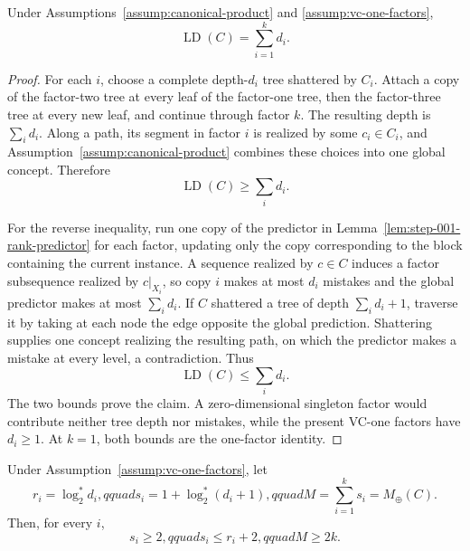 \begin{proposition}
\label{prop:step-001-product-littlestone}
Under Assumptions~\ref{assump:canonical-product} and
\ref{assump:vc-one-factors},
\[
\operatorname{LD}(C)=\sum_{i=1}^k d_i.
\]
\end{proposition}

\begin{proof}
For each \(i\), choose a complete depth-\(d_i\) tree shattered by \(C_i\).
Attach a copy of the factor-two tree at every leaf of the factor-one tree,
then the factor-three tree at every new leaf, and continue through factor
\(k\).  The resulting depth is \(\sum_i d_i\).  Along a path, its segment
in factor \(i\) is realized by some \(c_i\in C_i\), and
Assumption~\ref{assump:canonical-product} combines these choices into one
global concept.  Therefore
\begin{equation}\label{eq:step-001-ld-lower}
\operatorname{LD}(C)\ge\sum_i d_i.
\end{equation}

For the reverse inequality, run one copy of the predictor in
Lemma~\ref{lem:step-001-rank-predictor} for each factor, updating only the
copy corresponding to the block containing the current instance.  A
sequence realized by \(c\in C\) induces a factor subsequence realized by
\(c|_{X_i}\), so copy \(i\) makes at most \(d_i\) mistakes and the global
predictor makes at most \(\sum_i d_i\).  If \(C\) shattered a tree of depth
\(\sum_i d_i+1\), traverse it by taking at each node the edge opposite the
global prediction.  Shattering supplies one concept realizing the resulting
path, on which the predictor makes a mistake at every level, a contradiction.
Thus
\begin{equation}\label{eq:step-001-ld-upper}
\operatorname{LD}(C)\le\sum_i d_i.
\end{equation}
The two bounds prove the claim.  A zero-dimensional singleton factor would
contribute neither tree depth nor mistakes, while the present VC-one factors
have \(d_i\ge1\).  At \(k=1\), both bounds are the one-factor identity.
\end{proof}

\begin{lemma}
\label{lem:step-001-logstar}
Under Assumption~\ref{assump:vc-one-factors}, let
\[
r_i=\log_2^*d_i,qquad
s_i=1+\log_2^*(d_i+1),qquad
M=\sum_{i=1}^k s_i=M_{\oplus}(C).
\]
Then, for every \(i\),
\[
s_i\ge2,qquad s_i\le r_i+2,qquad M\ge2k.
\]
\end{lemma}


